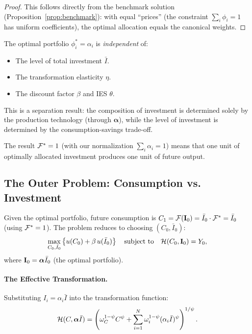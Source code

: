 \begin{proof}
This follows directly from the benchmark solution (Proposition~\ref{prop:benchmark}): with equal ``prices'' (the constraint $\sum_i \phi_i = 1$ has uniform coefficients), the optimal allocation equals the canonical weights.
\end{proof}

\begin{calloutnote}
The optimal portfolio $\phi_i^* = \alpha_i$ is \emph{independent} of:
\begin{itemize}[nosep]
\item The level of total investment $\bar{I}$.
\item The transformation elasticity $\eta$.
\item The discount factor $\beta$ and IES $\theta$.
\end{itemize}
This is a separation result: the composition of investment is determined solely by the production technology (through $\boldsymbol{\alpha}$), while the level of investment is determined by the consumption-savings trade-off.

The result $\mathcal{F}^* = 1$ (with our normalization $\sum_i \alpha_i = 1$) means that one unit of optimally allocated investment produces one unit of future output.
\end{calloutnote}

\subsection{The Outer Problem: Consumption vs. Investment}
\label{subsec:ac-het-outer}

Given the optimal portfolio, future consumption is $C_1 = \mathcal{F}(\mathbf{I}_0) = \bar{I}_0 \cdot \mathcal{F}^* = \bar{I}_0$ (using $\mathcal{F}^* = 1$). The problem reduces to choosing $(C_0, \bar{I}_0)$:
\begin{equation}
\max_{C_0, \bar{I}_0} \left\{ u(C_0) + \beta \, u(\bar{I}_0) \right\} \quad \text{subject to} \quad \mathcal{H}(C_0, \mathbf{I}_0) = Y_0,
\label{eq:ac-het-outer}
\end{equation}
where $\mathbf{I}_0 = \boldsymbol{\alpha} \bar{I}_0$ (the optimal portfolio).

\paragraph{The Effective Transformation.}
Substituting $I_i = \alpha_i \bar{I}$ into the transformation function:
\begin{equation}
\mathcal{H}(C, \boldsymbol{\alpha} \bar{I}) = \left( \omega_C^{1-\psi} C^{\psi} + \sum_{i=1}^{N} \omega_i^{1-\psi} (\alpha_i \bar{I})^{\psi} \right)^{1/\psi}.
\label{eq:ac-het-H-sub}
\end{equation}

